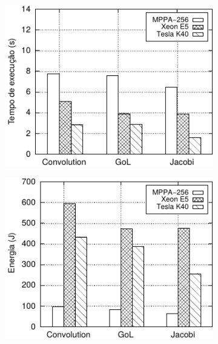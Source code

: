 \begin{figure}
  \centering
  \caption{\mppa \async \textit{vs.} \cpu \textit{vs.} \gpu}
  \begin{subfigure}{0.494\textwidth}
    \centering
    \includegraphics[width=1\textwidth]{figs/ComparisonTimeTiles10.pdf}
    \label{fig:compara-tempo-async-cpu-gpu}
  \end{subfigure}
  \begin{subfigure}{0.494\textwidth}
    \centering
    \includegraphics[width=1\textwidth]{figs/ComparisonEnergyTiles10.pdf}
    \label{fig:compara-energia-async-cpu-gpu}
  \end{subfigure}
  \label{fig:async_vs_cpu_gpu}
\end{figure}